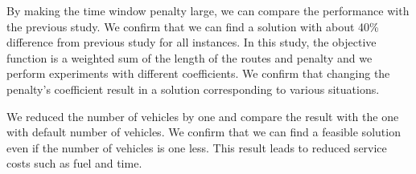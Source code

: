 By making the time window penalty large, we can compare the performance with the previous study. We confirm that we can find a solution with about 40\% difference from previous study for all instances.
In this study, the objective function is a weighted sum of the length of the routes and penalty and we perform experiments with different coefficients.
We confirm that changing the penalty's coefficient result in a solution corresponding to various situations.

We reduced the number of vehicles by one and compare the result with the one with default number of vehicles. We confirm that we can find a feasible solution even if the number of vehicles is one less.
This result leads to reduced service costs such as fuel and time.
